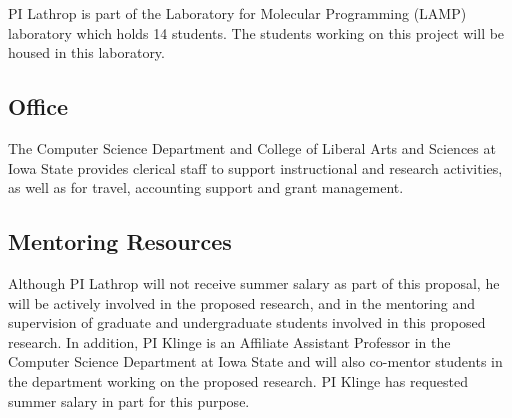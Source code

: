 \documentclass[11pt]{article}
\begin{document}
    PI Lathrop is part of the Laboratory for Molecular Programming (LAMP)
    laboratory which holds 14 students. The students working
    on this project will be housed in this laboratory.

    \subsection*{Office}
    The Computer Science Department and College of Liberal Arts and
    Sciences at Iowa State provides 
    clerical staff to support instructional and research activities, as
    well as for  travel, accounting support and grant management.

    \subsection*{Mentoring Resources}
    Although PI Lathrop will not receive summer salary as part of this proposal, he will be actively involved in the proposed research, and in the mentoring and supervision of graduate and undergraduate students involved in this proposed research.  In addition, PI Klinge is an Affiliate Assistant Professor in the Computer Science Department at Iowa State and will also co-mentor students in the department working on the proposed research.  PI Klinge has requested summer salary in part for this purpose.
\end{document}
